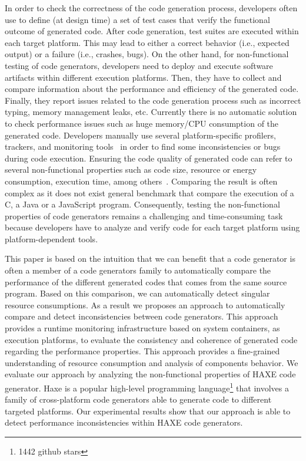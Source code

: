 In order to check the correctness of the code generation process, developers often use to define (at design time) a set of test cases that verify the functional outcome of generated code. After code generation, test suites are executed within each target platform. This may lead to either a correct behavior (i.e., expected output) or a failure (i.e., crashes, bugs). On the other hand, for non-functional testing of code generators, developers need to deploy and execute software artifacts within different execution platforms. Then, they have to collect and compare information about the performance and efficiency of the generated code. Finally, they report issues related to the code generation process such as incorrect typing, memory management leaks, etc. Currently there is no automatic solution to check performance issues such as huge memory/CPU consumption of the generated code.  Developers manually use several platform-specific profilers, trackers, and monitoring tools~\cite{guana2014chaintracker,delgado2004taxonomy} in order to find some inconsistencies or bugs during code execution. Ensuring the code quality of generated code can refer to several non-functional properties such as code size, resource or energy consumption, execution time, among others~\cite{pan2006fast}. Comparing the result is often complex as it does not exist general benchmark that compare the execution of a C, a Java or a JavaScript program. Consequently, testing the non-functional properties of code generators remains a challenging and time-consuming task because developers have to analyze and verify code for each target platform using platform-dependent tools.

This paper is based on the intuition that we can benefit that a code generator is often a member of a code generators family to automatically compare the  performance of the different generated codes that comes from the same source program. Based on this comparison, we can automatically detect singular resource consumptions. As a result we proposes an approach to automatically compare and detect inconsistencies between code generators. This approach provides a runtime monitoring infrastructure based on system containers, as execution platforms, to evaluate the consistency and coherence of generated code regarding the performance properties. This approach provides a fine-grained understanding of resource consumption and analysis of components behavior. 
We evaluate our approach by analyzing the non-functional properties of HAXE code generator. Haxe is a popular high-level programming language\footnote{1442 github stars} that involves a family of cross-platform code generators able to generate code to different targeted platforms. Our experimental results show that our approach is able to detect performance inconsistencies within HAXE code generators.


